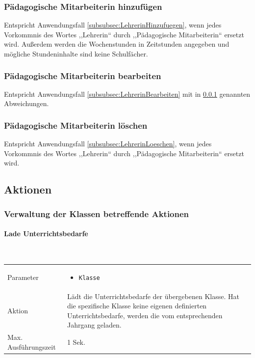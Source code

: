 \documentclass[fontsize=12pt,paper=a4,twoside]{scrartcl}
\begin{document}
\subsubsection{Pädagogische Mitarbeiterin hinzufügen}
\label{subsubsec:PaedMitarbeiterinHinzufuegen}
Entspricht Anwendungsfall \ref{subsubsec:LehrerinHinzufuegen}, wenn jedes Vorkommnis des Wortes ,,Lehrerin`` durch ,,Pädagogische Mitarbeiterin`` ersetzt wird. Außerdem werden die Wochenstunden in Zeitstunden angegeben und mögliche Stundeninhalte sind keine Schulfächer.


\subsubsection{Pädagogische Mitarbeiterin bearbeiten}
\label{subsubsec:PaedMitarbeiterinBearbeiten}
Entspricht Anwendungsfall \ref{subsubsec:LehrerinBearbeiten} mit in \ref{subsubsec:PaedMitarbeiterinHinzufuegen} genannten Abweichungen. 


\label{subsubsec:PaedMitarbeiterinLoeschen}
\subsubsection{Pädagogische Mitarbeiterin löschen}
Entspricht Anwendungsfall \ref{subsubsec:LehrerinLoeschen}, wenn jedes Vorkommnis des Wortes ,,Lehrerin`` durch ,,Pädagogische Mitarbeiterin`` ersetzt wird. 

\subsection{Aktionen}

\subsubsection{Verwaltung der Klassen betreffende Aktionen}

\paragraph{Lade Unterrichtsbedarfe}\mbox{}\\

\begin{tabularx}{\textwidth}{p{4cm}X}
Parameter & \begin{itemize}[itemsep=0pt, leftmargin = 0.5cm]
			\item \texttt{Klasse}
			\end{itemize}\\
Aktion & Lädt die Unterrichtsbedarfe der übergebenen Klasse. Hat die spezifische Klasse keine eigenen definierten Unterrichtsbedarfe, werden die vom entsprechenden Jahrgang geladen.\\
Max. Ausführungszeit & 1 Sek. 
\end{tabularx}\\
\end{document}
